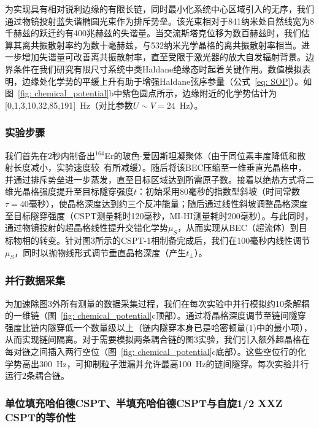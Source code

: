 \documentclass[preprint,superscriptaddress,floatfix, nofootinbib]{revtex4-2}
\begin{document}
\begin{CJK*}{UTF8}{gbsn}
为实现具有相对锐利边缘的有限长链，同时最小化系统中心区域引入的无序，我们通过物镜投射蓝失谐椭圆光束作为排斥势垒\cite{Gaunt2013}。该光束相对于841纳米处自然线宽为8千赫兹的跃迁约有400兆赫兹的失谐量。当交流斯塔克位移为数百赫兹时，我们估算其离共振散射率约为数十毫赫兹，与532纳米光学晶格的离共振散射率相当。进一步增加失谐量可改善离共振散射率，直至受限于激光器的放大自发辐射背景。边界条件在我们研究有限尺寸系统中类Haldane绝缘态时起着关键作用。数值模拟表明，边缘处化学势的平缓上升有助于增强Haldane弦序参量（公式~\eqref{eq: SOP}）。如图~\ref{fig: chemical_potential}b中紫色圆点所示，边缘附近的化学势估计为[0,1,3,10,32,85,191]~Hz（对比参数$U\sim V=24$~Hz）。
\subsubsection*{实验步骤}

我们首先在2秒内制备出$^{164}$Er的玻色-爱因斯坦凝聚体（由于同位素丰度降低和散射长度减小，实验速度较~\cite{Phelps2020}有所减缓）。随后将该BEC压缩至一维垂直光晶格中，并通过排斥势垒进一步蒸发，直至目标区域达到所需原子数。接着以绝热方式将二维光晶格强度提升至目标隧穿强度$t$：初始采用80毫秒的指数型斜坡（时间常数$\tau = 40$毫秒），使晶格深度达到约三个反冲能量；随后通过线性斜坡调整晶格深度至目标隧穿强度（CSPT测量耗时120毫秒，MI-HI测量耗时200毫秒）。与此同时，通过物镜投射的超晶格线性提升交错化学势$\mu_S$，从而实现从BEC（超流体）到目标物相的转变。针对图3所示的CSPT-1相制备完成后，我们在100毫秒内线性调节$\mu_S$，同时以抛物线形式调节垂直晶格深度（产生$t_\perp$）。
\subsubsection*{并行数据采集}

为加速除图3外所有测量的数据采集过程，我们在每次实验中并行模拟约10条解耦的一维链（图~\ref{fig: chemical_potential}c顶部）。通过将晶格深度调节至链间隧穿强度比链内隧穿低一个数量级以上（链内隧穿本身已是哈密顿量(1)中的最小项），从而实现链间隔离。对于需要模拟两条耦合链的图3实验，我们引入额外超晶格在每对链之间插入两行空位（图~\ref{fig: chemical_potential}c底部）。这些空位行的化学势高出300~Hz，可抑制粒子泄漏并允许最高100~Hz的链间隧穿。每次实验并行运行2条耦合链。
\subsubsection*{单位填充哈伯德CSPT、半填充哈伯德CSPT与自旋1/2 XXZ CSPT的等价性}


\end{CJK*}
\end{document}
